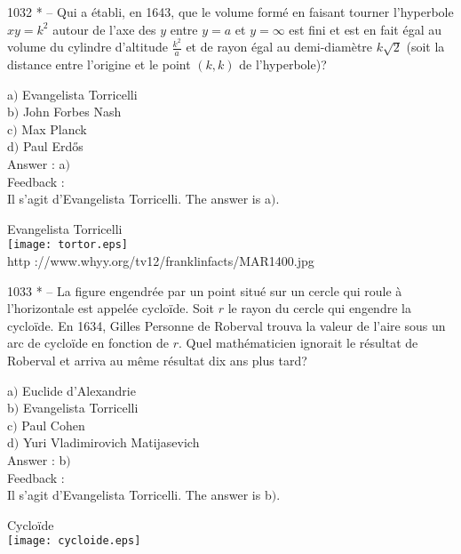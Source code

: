 \documentclass[letterpaper, 12pt]{article}
\begin{document}
1032 * -- Qui a \'etabli, en 1643, que le volume form\'e en faisant
tourner l'hyperbole $xy=k^2$ autour de l'axe des $y$ entre $y=a$ et
$y=\infty$ est fini et est en fait \'egal au volume du cylindre
d'altitude $\frac{k^2}a$ et de rayon \'egal au demi-diam\`etre
$k\sqrt2$ (soit la distance entre l'origine et le point $(k,k)$ de
l'hyperbole)?

a$)$ Evangelista Torricelli \\
b$)$ John Forbes Nash \\
c$)$ Max Planck \\
d$)$ Paul Erd\H{o}s  \\

Answer : a$)$\\

Feedback : \\
Il s'agit d'Evangelista Torricelli. The answer is a$)$.\\

        \begin{center}
        Evangelista Torricelli\\
    \texttt{[image: tortor.eps]}\\
        {\footnotesize http ://www.whyy.org/tv12/franklinfacts/MAR1400.jpg}
    \end{center}

1033 * -- La figure engendr\'ee par un point situ\'e sur un cercle
qui roule \`a l'horizontale est appel\'ee cyclo\"ide. Soit $r$ le
rayon du cercle qui engendre la cyclo\"ide. En 1634, Gilles Personne
de Roberval trouva la valeur de l'aire sous un arc de cyclo\"ide en
fonction de $r$. Quel math\'ematicien ignorait le r\'esultat de
Roberval et arriva au m\^eme r\'esultat dix ans plus tard?

a$)$ Euclide d'Alexandrie \\
b$)$ Evangelista Torricelli \\
c$)$ Paul Cohen \\
d$)$ Yuri Vladimirovich Matijasevich\\

Answer : b$)$\\

Feedback : \\
Il s'agit d'Evangelista Torricelli. The answer is b$)$.\\

        \begin{center}
Cyclo\"ide\\
    \texttt{[image: cycloide.eps]}\\
    \end{center}
\end{document}
